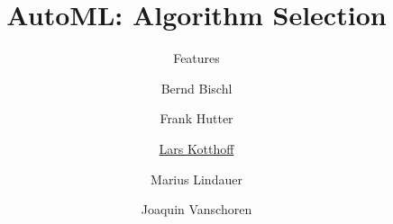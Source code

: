 



\title[AutoML: Overview]{AutoML: Algorithm Selection} %
\subtitle{Features} %
\author[Lars Kotthoff]{Bernd Bischl \and Frank Hutter \and \underline{Lars Kotthoff}\newline \and Marius Lindauer \and Joaquin Vanschoren}
\institute{}
\date{}




	
\maketitle

